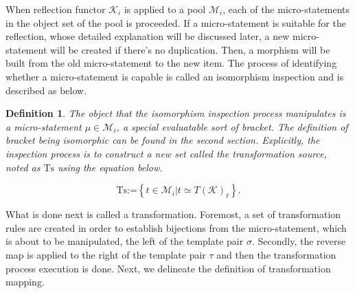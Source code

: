 \documentclass{aims}
\numberwithin{equation}{section}
\newtheorem{definition}{Definition}	%
\numberwithin{theorem}{section}	%
\numberwithin{axiom}{section}	%
\numberwithin{definition}{section}	%
\begin{document}
	When reflection functor \(\mathcal{K}_i\) is applied to a pool \(\mathcal{M}_i\), each of the micro-statements in the object set of the pool is proceeded. If a micro-statement is suitable for the reflection, whose detailed explanation will be discussed later, a new micro-statement will be created if there{'}s no duplication. Then, a morphism will be built from the old micro-statement to the new item. The process of identifying whether a micro-statement is capable is called an{ isomorphism inspection} and is described as below.
	
	\begin{definition}
		The object that the isomorphism inspection process manipulates is a micro-statement \(\mu \in \mathcal{M}_i\), a special evaluatable sort of bracket. The definition of bracket being isomorphic can be found in the second section. Explicitly, the inspection process is to construct a new set called the{ transformation source}, noted as \(\text{Ts}\) using the equation below.
		
		\begin{equation}
			\text{Ts}\text{:=}\left\{t\in \mathcal{M}_i|t\simeq T(\mathcal{K})_{\ell }\right\}.
		\end{equation}
	\end{definition}
	
	What is done next is called a{ transformation}. Foremost, a set of transformation rules are created in order to establish bijections from the micro-statement, which is about to be manipulated, the left of the template pair \(\sigma\). Secondly, the reverse map is applied to the right of the template pair \(\tau\) and then the transformation process execution is done. Next, we delineate the definition of { }transformation mapping.
	
\end{document}
